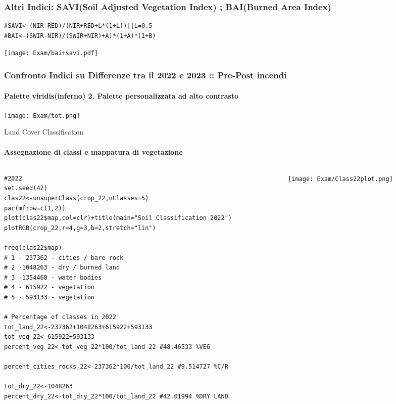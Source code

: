 \documentclass{beamer}
\begin{document}
\begin{frame}[fragile]
\frametitle{\scriptsize Altri Indici: SAVI(Soil Adjusted Vegetation Index) ; BAI(Burned Area Index)}

  \begin{lstlisting}[style=mystyle]
#SAVI<-(NIR-RED)/(NIR+RED+L*(1+L))||L=0.5
#BAI<-(SWIR-NIR)/(SWIR+NIR)+A)*(1+A)*(1+B)
            \end{lstlisting}
            
            \begin{center}
\texttt{[image: Exam/bai+savi.pdf]}  
\end{center}
\end{frame}

\begin{frame}[fragile]
\frametitle{\scriptsize Confronto Indici su Differenze tra il 2022 e 2023 :: Pre-Post incendi}
\framesubtitle{\tiny Palette viridis(inferno) 2. Palette personalizzata ad alto contrasto}

\texttt{[image: Exam/tot.png]} 

\end{frame}

\begin{frame}[fragile]{Land Cover Classification}
    \framesubtitle{Assegnazione di classi e mappatura di vegetazione}
    \begin{columns}
        \begin{column}{0.45\textwidth}
            \begin{lstlisting}[style=mystyle]
#2022
set.seed(42) 
clas22<-unsuperClass(crop_22,nClasses=5)
par(mfrow=c(1,2))
plot(clas22$map,col=clr)+title(main="Soil Classification 2022")
plotRGB(crop_22,r=4,g=3,b=2,stretch="lin")

freq(clas22$map)
# 1 - 237362 - cities / bare rock  
# 2 -1048263 - dry / burned land
# 3 -1354468 - water bodies
# 4 - 615922 - vegetation
# 5 - 593133 - vegetation

# Percentage of classes in 2022
tot_land_22<-237362+1048263+615922+593133
tot_veg_22<-615922+593133
percent_veg_22<-tot_veg_22*100/tot_land_22 #48.46533 %VEG

percent_cities_rocks_22<-237362*100/tot_land_22 #9.514727 %C/R

tot_dry_22<-1048263 
percent_dry_22<-tot_dry_22*100/tot_land_22 #42.01994 %DRY LAND
            \end{lstlisting}
        \end{column}
        
        \begin{column}{0.47\textwidth}
            \texttt{[image: Exam/Class22plot.png]}
        \end{column}
    \end{columns}

\end{frame}
\end{document}
